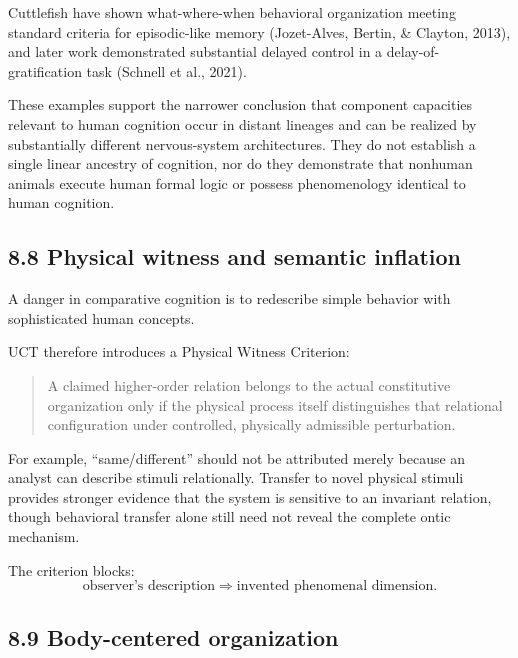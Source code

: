 \documentclass[
  11pt,
  a4paper,
]{article}
\begin{document}
Cuttlefish have shown what-where-when behavioral organization meeting
standard criteria for episodic-like memory (Jozet-Alves, Bertin, \&
Clayton, 2013), and later work demonstrated substantial delayed control
in a delay-of-gratification task (Schnell et al., 2021).

These examples support the narrower conclusion that component capacities
relevant to human cognition occur in distant lineages and can be
realized by substantially different nervous-system architectures. They
do not establish a single linear ancestry of cognition, nor do they
demonstrate that nonhuman animals execute human formal logic or possess
phenomenology identical to human cognition.

\hypertarget{physical-witness-and-semantic-inflation}{%
\subsection{8.8 Physical witness and semantic
inflation}\label{physical-witness-and-semantic-inflation}}

A danger in comparative cognition is to redescribe simple behavior with
sophisticated human concepts.

UCT therefore introduces a Physical Witness Criterion:

\begin{quote}
A claimed higher-order relation belongs to the actual constitutive
organization only if the physical process itself distinguishes that
relational configuration under controlled, physically admissible
perturbation.
\end{quote}

For example, ``same/different'' should not be attributed merely because
an analyst can describe stimuli relationally. Transfer to novel physical
stimuli provides stronger evidence that the system is sensitive to an
invariant relation, though behavioral transfer alone still need not
reveal the complete ontic mechanism.

The criterion blocks:
\nopagebreak[4]
\[
\text{observer's description}
\Rightarrow
\text{invented phenomenal dimension}.
\]

\hypertarget{body-centered-organization}{%
\subsection{8.9 Body-centered
organization}\label{body-centered-organization}}
\end{document}
